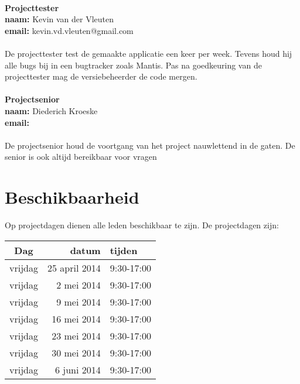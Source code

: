 \\
\textbf{Projecttester}\\
\textbf{naam:}	Kevin van der Vleuten\\
\textbf{email:}	kevin.vd.vleuten@gmail.com\\
\\
De projecttester test de gemaakte applicatie een keer per week. Tevens houd hij alle bugs bij in een bugtracker zoals Mantis. Pas na goedkeuring van de projecttester mag de versiebeheerder de code mergen.\\
\\
\textbf{Projectsenior}\\
\textbf{naam:}	Diederich Kroeske\\
\textbf{email:}	\\
\\
De projectsenior houd de voortgang van het project nauwlettend in de gaten. De senior is ook altijd bereikbaar voor vragen\\

\section{Beschikbaarheid} \label{sec:typesetting}
Op projectdagen dienen alle leden beschikbaar te zijn. De projectdagen zijn:
\begin{table}[h]
  \label{tb:table}
  \begin{tabular}{crl}
    \toprule
    Dag     & 			datum & 		tijden    \\
    \midrule
    vrijdag     & 25 	april 	2014   & 9:30-17:00\\
    vrijdag     & 2 	mei 	2014   & 9:30-17:00\\
    vrijdag     & 9 	mei 	2014   & 9:30-17:00\\
    vrijdag     & 16 	mei 	2014   & 9:30-17:00\\
    vrijdag     & 23 	mei 	2014   & 9:30-17:00\\
    vrijdag     & 30 	mei 	2014   & 9:30-17:00\\
    vrijdag     & 6 	juni 	2014   & 9:30-17:00\\
    \bottomrule
  \end{tabular}
\end{table}